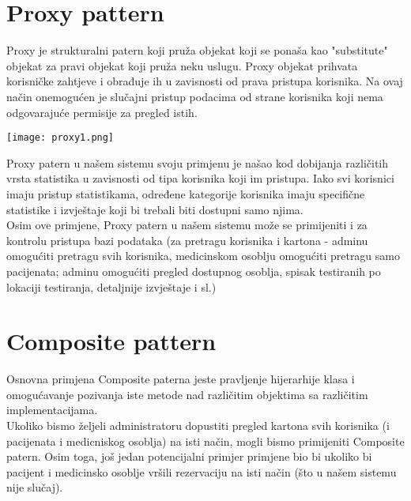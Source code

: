 \documentclass{article}
\begin{document}
\section*{Proxy pattern}
\vspace{1mm}
Proxy je strukturalni patern koji pruža objekat koji se ponaša kao "substitute" objekat za pravi objekat koji pruža neku uslugu. Proxy objekat prihvata korisničke zahtjeve i obrađuje ih u zavisnosti od prava pristupa korisnika.
Na ovaj način onemogućen je slučajni pristup podacima od strane korisnika koji nema odgovarajuće permisije za pregled istih.\\
\begin{center}
\texttt{[image: proxy1.png]}   
\end{center}
Proxy patern u našem sistemu svoju primjenu je našao kod dobijanja različitih vrsta statistika u zavisnosti od tipa korisnika koji im pristupa.
Iako svi korisnici imaju pristup statistikama, određene kategorije korisnika imaju specifične statistike i izvještaje koji bi trebali biti dostupni samo njima.\\Osim ove primjene, Proxy patern u našem sistemu može se primijeniti i za kontrolu pristupa bazi podataka (za pretragu korisnika i kartona - adminu omogućiti pretragu svih korisnika, medicinskom osoblju omogućiti pretragu samo pacijenata; adminu omogućiti pregled dostupnog osoblja, spisak testiranih po lokaciji testiranja, detaljnije izvještaje i sl.)


\section*{Composite pattern}
\vspace{1mm}
Osnovna primjena Composite paterna jeste pravljenje hijerarhije klasa i omogućavanje pozivanja iste metode nad različitim objektima sa različitim implementacijama.\\

Ukoliko bismo željeli administratoru dopustiti pregled kartona svih korisnika (i pacijenata i medicniskog osoblja) na isti način, mogli bismo primijeniti Composite patern. Osim toga, još jedan potencijalni primjer primjene bio bi ukoliko bi pacijent i medicinsko osoblje vršili rezervaciju na isti način (što u našem sistemu nije slučaj).
\end{document}
